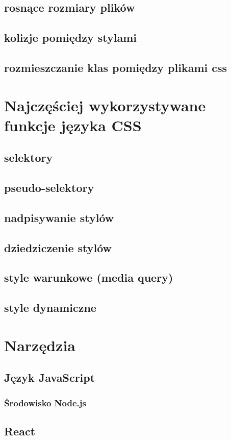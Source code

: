 \documentclass[a4paper,12pt]{book} %
\begin{document}
\section{rosnące rozmiary plików}
\section{kolizje pomiędzy stylami}
\section{rozmieszczanie klas pomiędzy plikami css}

\chapter{Najczęściej wykorzystywane funkcje języka CSS}
\section{selektory}
\section{pseudo-selektory}
\section{nadpisywanie stylów}
\section{dziedziczenie stylów}
\section{style warunkowe (media query)}
\section{style dynamiczne}


\chapter{Narzędzia}
\section{Język JavaScript}
\subsection{Środowisko Node.js}
\section{React}
\end{document}
